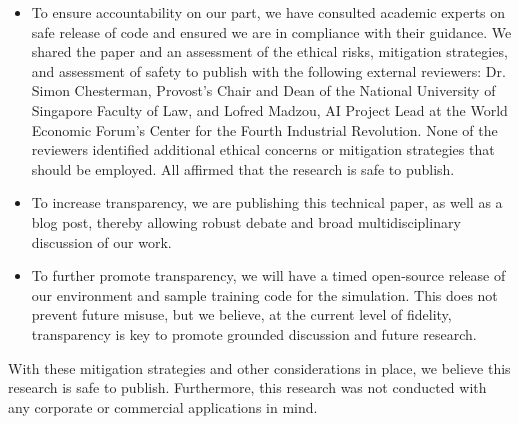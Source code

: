 \begin{itemize}
\item To ensure accountability on our part, we have consulted academic experts on safe release of code and ensured we are in compliance with their guidance. We shared the paper and an assessment of the ethical risks, mitigation strategies, and assessment of safety to publish with the following external reviewers:
Dr. Simon Chesterman, Provost’s Chair and Dean of the National University of Singapore Faculty of Law, and Lofred Madzou, AI Project Lead at the World Economic Forum's Center for the Fourth Industrial Revolution.
None of the reviewers identified additional ethical concerns or mitigation strategies that should be employed. All affirmed that the research is safe to publish.
\item To increase transparency, we are publishing this technical paper, as well as a blog post, thereby allowing robust debate and broad multidisciplinary discussion of our work.
\item To further promote transparency, we will have a timed open-source release of our environment and sample training code for the simulation.
This does not prevent future misuse, but we believe, at the current level of fidelity, transparency is key to promote grounded discussion and future research.
\end{itemize}

With these mitigation strategies and other considerations in place, we believe this research is safe to publish.
Furthermore, this research was not conducted with any corporate or commercial applications in mind.
